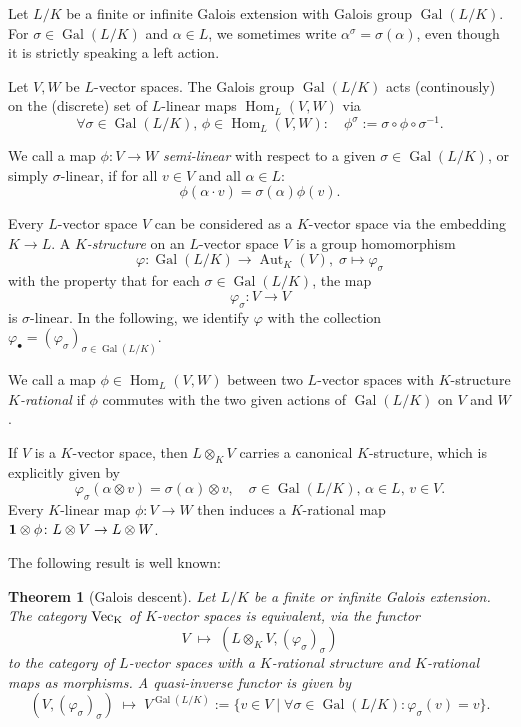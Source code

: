 \documentclass[a4paper,12pt,reqno]{amsart}
\DeclareMathOperator{\Aut}{\mathrm{Aut}}
\DeclareMathOperator{\Hom}{\mathrm{Hom}}
\DeclareMathOperator{\Gal}{\mathrm {Gal}}
\theoremstyle{plain}
\newtheorem{theorem}{Theorem}[section]
\theoremstyle{remark}
\begin{document}
Let $L/K$ be a finite or infinite Galois extension with Galois group $\Gal(L/K)$. For $\sigma\in\Gal(L/K)$ and $\alpha\in L$, we sometimes write $\alpha^\sigma=\sigma(\alpha)$, even though it is strictly speaking a left action.

Let $V, W$ be $L$-vector spaces. The Galois group $\Gal(L/K)$ acts (continously) on the (discrete) set of $L$-linear maps $\Hom_L(V,W)$ via
\[
\forall\sigma\in\Gal(L/K),\,\phi\in\Hom_L(V,W)\colon\quad \phi^\sigma:=\sigma\circ\phi\circ\sigma^{-1}.
\]

We call a map $\phi\colon V\to W$ {\em semi-linear} with respect to a given $\sigma\in\Gal(L/K)$, or simply $\sigma$-linear, if for all $v\in V$ and all $\alpha\in L$:
\[
\phi(\alpha\cdot v)=\sigma(\alpha)\phi(v).
\]

Every $L$-vector space $V$ can be considered as a $K$-vector space via the embedding $K\to L$. A {\em $K$-structure} on an $L$-vector space $V$ is a group homomorphism
\[
\varphi\colon\Gal(L/K)\to\Aut_K(V),\;\sigma\mapsto\varphi_\sigma
\]
with the property that for each $\sigma\in\Gal(L/K)$, the map
\[
\varphi_\sigma\colon V\to V
\]
is $\sigma$-linear. In the following, we identify $\varphi$ with the collection $\varphi_\bullet=(\varphi_\sigma)_{\sigma\in\Gal(L/K)}$.

We call a map $\phi\in\Hom_L(V,W)$ between two $L$-vector spaces with $K$-structure {\em $K$-rational} if $\phi$ commutes with the two given actions of $\Gal(L/K)$ on $V$ and $W$.

If $V$ is a $K$-vector space, then $L\otimes_K V$ carries a canonical $K$-structure, which is explicitly given by
\[
\varphi_\sigma(\alpha\otimes v)=\sigma(\alpha)\otimes v,\quad \sigma\in\Gal(L/K),\,\alpha\in L,\,v\in V.
\]
Every $K$-linear map $\phi\colon V\to W$ then induces a $K$-rational map ${\bf1}\otimes\phi\colon L\otimes V\to L\otimes W$.

The following result is well known:

\begin{theorem}[Galois descent]\label{thm:galoisdescent}
  Let $L/K$ be a finite or infinite Galois extension. The category $\rm{Vec}_K$ of $K$-vector spaces is equivalent, via the functor
  \[
  V\;\mapsto\; \left(L\otimes_K V,(\varphi_\sigma)_{\sigma}\right)
  \]
  to the category of $L$-vector spaces with a $K$-rational structure and $K$-rational maps as morphisms. A quasi-inverse functor is given by
  \[
  \left(V,(\varphi_\sigma)_\sigma\right)\;\mapsto\;V^{\Gal(L/K)}:=\{v\in V\mid\forall\sigma\in\Gal(L/K)\colon \varphi_\sigma(v)=v\}.
  \]
\end{theorem}
\end{document}

